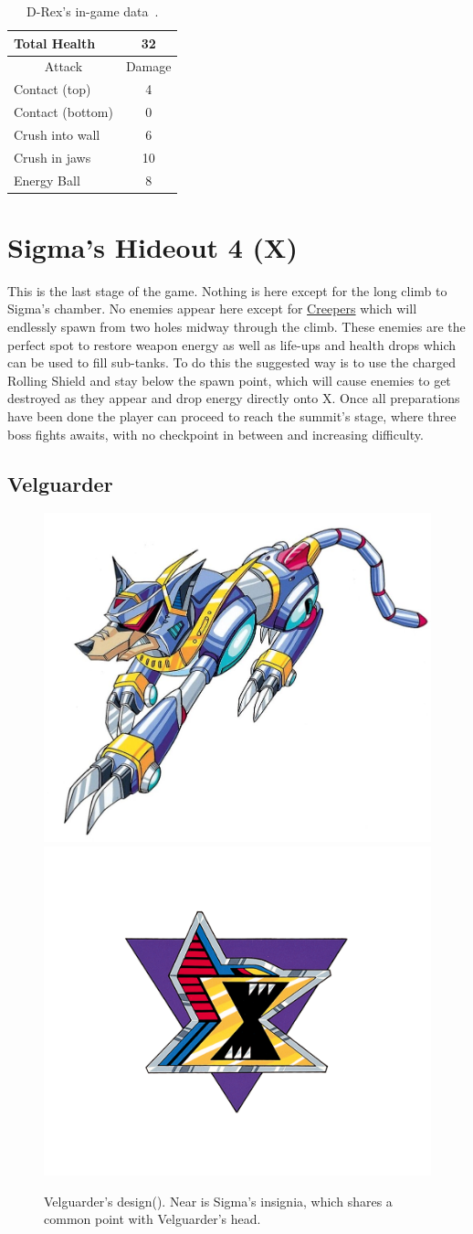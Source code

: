 \begin{table}
	\centering
	\begin{tabular}[htp]{l c}
		\toprule
		Total Health  & 32\\
		\midrule
		\multicolumn{1}{c}{Attack} & \multicolumn{1}{c}{Damage}\\
		Contact (top) & 4\\
		Contact (bottom) & 0\\
		Crush into wall & 6\\
		Crush in jaws & 10\\
		Energy Ball & 8\\
		\bottomrule
	\end{tabular}
	\caption{D-Rex's in-game data~\cite{wiki:D-REX}.}
\end{table}
\section{Sigma's Hideout 4 (X)}
This is the last stage of the game. Nothing  is here except for the long climb to Sigma's chamber. No enemies appear here except for \hyperlink{enem:Creeper}{Creepers} which will endlessly spawn from two holes midway through the climb. These enemies are the perfect spot to restore weapon energy as well as life-ups and health drops which can be used to fill sub-tanks. To do this the suggested way is to use the charged Rolling Shield and stay below the spawn point, which will cause enemies to get destroyed as they appear and drop energy directly onto X. Once all preparations have been done the player can proceed to reach the summit's stage, where three boss fights awaits, with no checkpoint in between and increasing difficulty.

\subsection{Velguarder}\label{boss:Velguarder}
\begin{figure}[htp]
	\centering
	\includegraphics[width=0.4\linewidth]{figures/X1/Sigma_stages/Velguarder.jpg}
	\includegraphics[width=0.4\linewidth]{figures/X1/Sigma_stages/Sigma_logo.png}
	\caption{Velguarder's design(\cite{book:MMX_Complete_art}). Near is Sigma's insignia, which shares a common point with Velguarder's head.}
\end{figure}


